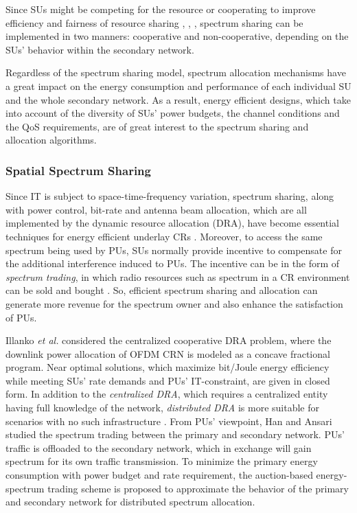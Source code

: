 \documentclass[journal,12pt,onecolumn]{IEEEtran}
\begin{document}
Since SUs might be competing for the resource or cooperating to improve efficiency and fairness of resource sharing \cite{relayDef}, \cite{spectrumSharingDefAmongSUs}, \cite{spectrumTradingDef}, spectrum sharing can be implemented in two manners: cooperative and non-cooperative, depending on the SUs' behavior within the secondary network.

Regardless of the spectrum sharing model, spectrum allocation mechanisms have a great impact on the energy consumption and performance of each individual SU and the whole secondary network. As a result, energy efficient designs, which take into account of the diversity of SUs' power budgets, the channel conditions and the QoS requirements, are of great interest to the spectrum sharing and allocation algorithms.

\subsubsection{Spatial Spectrum Sharing}
Since IT is subject to space-time-frequency variation, spectrum sharing, along with power control, bit-rate and antenna beam allocation, which are all implemented by the dynamic resource allocation (DRA), have become essential techniques for energy efficient underlay CRs \cite{5447050}. Moreover, to access the same spectrum being used by PUs, SUs normally provide incentive to compensate for the additional interference induced to PUs. The incentive can be in the form of \emph{spectrum trading}, in which radio resources such as spectrum in a CR environment can be sold and bought \cite{spectrumTradingDef}. So, efficient spectrum sharing and allocation can generate more revenue for the spectrum owner and also enhance the satisfaction of PUs.

Illanko \emph{et al.} \cite{ofdmPCnoCARRIER} considered the centralized cooperative DRA problem, where the downlink power allocation of OFDM CRN is modeled as a concave fractional program. Near optimal solutions, which maximize bit/Joule energy efficiency while meeting SUs' rate demands and PUs' IT-constraint, are given in closed form. In addition to the \emph{centralized DRA}, which requires a centralized entity having full knowledge of the network, \emph{distributed DRA} is more suitable for scenarios with no such infrastructure \cite{ULunderlay}. From PUs' viewpoint, Han and Ansari \cite{taoHan} studied the spectrum trading between the primary and secondary network. PUs' traffic is offloaded to the secondary network, which in exchange will gain spectrum for its own traffic transmission. To minimize the primary energy consumption with power budget and rate requirement, the auction-based energy-spectrum trading scheme is proposed to approximate the behavior of the primary and secondary network for distributed spectrum allocation.
\end{document}
